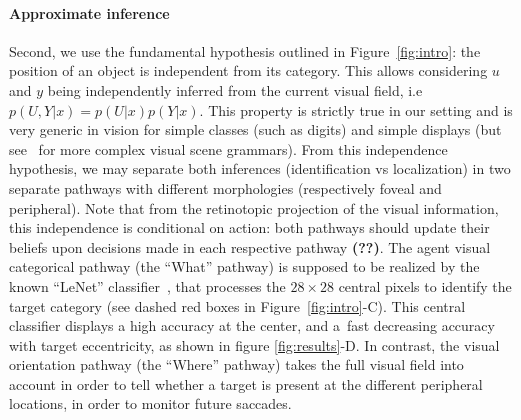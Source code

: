 \paragraph{Approximate inference}
Second, we %
use the fundamental hypothesis outlined in Figure~\ref{fig:intro}: the position of an object is independent from its category.  This allows considering $u$ and $y$ being independently inferred from the current visual field, i.e $p(U,Y|x) = p(U|x) p(Y|x)$. This property is strictly true in our setting and is very generic in vision for simple classes (such as digits) and simple displays (but see~\citep{Vo12} for more complex visual scene grammars). 
From this independence hypothesis, we may separate both inferences (identification vs localization) in two separate pathways with different morphologies (respectively foveal and peripheral). Note that from the retinotopic projection of the visual information, this independence is conditional on action: both pathways should update their beliefs upon decisions made in each respective pathway {\bf (??)}.
The agent visual categorical pathway (the ``What'' pathway) is supposed to be realized by the known ``LeNet'' classifier~\citep{Lecun1998}, that processes the $28 \times 28$ central pixels to identify the target category (see dashed red boxes in  Figure~\ref{fig:intro}-C). This central classifier displays a high accuracy at the center, and a fast decreasing accuracy with target eccentricity, as shown in figure \ref{fig:results}-D. In contrast, the visual orientation pathway (the ``Where'' pathway) takes the full visual field into account in order to tell whether a target is present at the different peripheral locations, in order to monitor future saccades.

